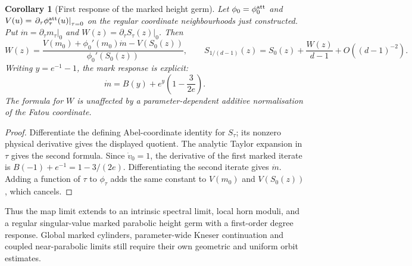 \documentclass[11pt]{article}
\newtheorem{corollary}[theorem]{Corollary}
\begin{document}
\begin{corollary}[First response of the marked height germ]
\label{cor:degree-response}
Let $\phi_0=\phi^{\rm att}_0$ and
$V(u)=\left.\partial_\tau\phi^{\rm att}_\tau(u)\right|_{\tau=0}$
on the regular coordinate neighbourhoods just constructed. Put
$\dot m=\left.\partial_\tau m_\tau\right|_0$ and
$W(z)=\left.\partial_\tau S_\tau(z)\right|_0$. Then
\[
 W(z)=\frac{V(m_0)+\phi_0'(m_0)\dot m-V(S_0(z))}
                  {\phi_0'(S_0(z))},\qquad
 S_{1/(d-1)}(z)=S_0(z)+\frac{W(z)}{d-1}+O((d-1)^{-2}).
\]
Writing $y=e^{-1}-1$, the mark response is explicit:
\[
 \dot m=B(y)+e^y\left(1-\frac{3}{2e}\right).
\]
The formula for $W$ is unaffected by a parameter-dependent additive
normalisation of the Fatou coordinate.
\end{corollary}
\begin{proof}
Differentiate the defining Abel-coordinate identity for $S_\tau$;
its nonzero physical derivative gives the displayed quotient.
The analytic Taylor expansion in $\tau$ gives the second formula.
Since $\dot v_0=1$, the derivative of the first marked iterate is
$B(-1)+e^{-1}=1-3/(2e)$. Differentiating the second iterate gives
$\dot m$. Adding a function of $\tau$ to $\phi_\tau$ adds the same
constant to $V(m_0)$ and $V(S_0(z))$, which cancels.
\end{proof}
Thus the map limit extends to an intrinsic spectral limit, local
horn moduli, and a regular singular-value marked parabolic height
germ with a first-order degree response. Global marked cylinders,
parameter-wide Kneser continuation and coupled near-parabolic limits
still require their own geometric and uniform orbit estimates.
\end{document}
